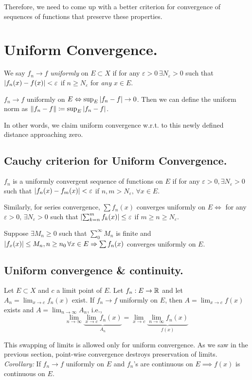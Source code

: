 Therefore, we need to come up with a better criterion for convergence of sequences of functions that preserve these properties.

\section{Uniform Convergence.}
\begin{definition}
We say $f_n\to f$ \emph{uniformly} on $E\subset X$ if for any $\varepsilon>0\,\exists N_\varepsilon>0$ such that $\left\lvert f_n(x)-f(x)\right\rvert<\varepsilon$ if $n\geq N_\varepsilon$ for \emph{any} $x\in E$.
\end{definition}
\begin{definition}
$f_n\to f$ uniformly on $E\Leftrightarrow\sup_E \left\lvert f_n-f\right\rvert\to 0$.
Then we can define the uniform norm as $\left\lVert f_n-f\right\rVert\coloneqq \sup_E \left\lvert f_n-f\right\rvert$.
\end{definition}
In other words, we claim uniform convergence w.r.t. to this newly defined distance approaching zero.

\subsection{Cauchy criterion for Uniform Convergence.}
$f_n$ is a uniformly convergent sequence of functions on $E$ if for any $\varepsilon>0,\exists N_\varepsilon>0$ such that $\left\lvert f_n(x)-f_m(x)\right\rvert<\varepsilon$ if $n,m>N_\varepsilon,\,\forall x\in E$.

Similarly, for series convergence, $\sum f_n(x)$ converges uniformly on $E\iff$ for any $\varepsilon>0,\,\exists N_\varepsilon>0$ such that $\left\lvert\sum^m_{k=n}f_k(x)\right\rvert\leq \varepsilon$ if $m\geq n\geq N_\varepsilon$. 

\begin{theorem}
Suppose $\exists M_n\geq 0$ such that $\sum^\infty_0 M_n$ is finite and $\left\lvert f_x(x)\right\rvert\leq M_n,n\geq n_0\,\forall x\in E\Rightarrow \sum f_n(x)$ converges uniformly on $E$.
\end{theorem}

\subsection{Uniform convergence \& continuity.}
Let $E\subset X$ and $c$ a limit point of $E$.
Let $f_n:E\to \mathbb{R}$ and let $A_n=\lim_{x\to c} f_n(x)$ exist.
If $f_n\to f$ uniformly on $E$, then $A=\lim_{x\to c}f(x)$ exists and $A=\lim_{n\to\infty} A_n$, i.e.,
\begin{equation*}
\lim_{n\to\infty} \underbrace{\lim_{x\to c}f_n(x)}_{A_n} = \lim_{x\to c}\underbrace{\lim_{n\to\infty} f_n(x)}_{f(x)}
\end{equation*}
\begin{remark}
This swapping of limits is allowed only for uniform convergence. As we saw in the previous section, point-wise convergence destroys preservation of limits.\\
\emph{Corollary:} If $f_n\to f$ uniformly on $E$ and $f_n$'s are continuous on $E\implies f(x)$ is continuous on $E$.
\end{remark}

